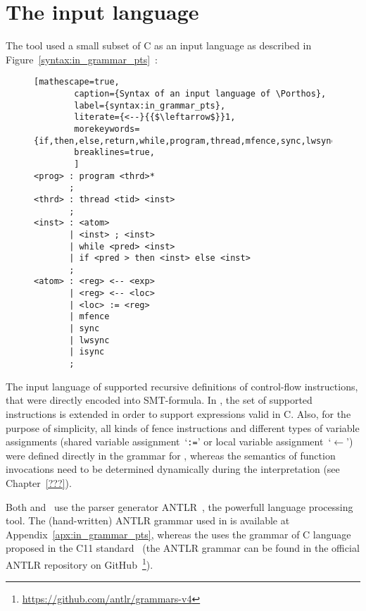 \chapter{The input language}
\label{ch:impl}

The \Porthos tool used a small subset of C as an input language as described in Figure~\ref{syntax:in_grammar_pts}~\cite{Porthos17}:

\begin{figure}[H]
\begin{lstlisting}[mathescape=true,
        caption={Syntax of an input language of \Porthos},
        label={syntax:in_grammar_pts},
        literate={<--}{{$\leftarrow$}}1,
        morekeywords={if,then,else,return,while,program,thread,mfence,sync,lwsync,isync}
        breaklines=true,
        ]
<prog> : program <thrd>*
       ;
<thrd> : thread <tid> <inst>
       ;
<inst> : <atom> 
       | <inst> ; <inst>
       | while <pred> <inst>
       | if <pred > then <inst> else <inst>
       ;
<atom> : <reg> <-- <exp> 
       | <reg> <-- <loc>
       | <loc> := <reg> 
       | mfence
       | sync
       | lwsync
       | isync
       ;
\end{lstlisting}
\end{figure}


The input language of \Porthos supported recursive definitions of control-flow instructions, that were directly encoded into SMT-formula. In \mousquetaires, the set of supported instructions is extended in order to support expressions valid in C.%
 Also, for the purpose of simplicity, all kinds of fence instructions and different types of variable assignments (shared variable assignment~`\texttt{:=}' or local variable assignment~`$\mathtt{\leftarrow}$') were defined directly in the grammar for \Porthos, whereas the semantics of function invocations need to be determined dynamically during the interpretation
(see Chapter~\ref{???}).

Both \Porthos and \mousquetaires \ use the parser generator ANTLR~\cite{parr2013definitive}, the powerfull language processing tool. The (hand-written) ANTLR grammar used in \Porthos is available at Appendix~\ref{apx:in_grammar_pts}, whereas the \mousquetaires uses the grammar of C language proposed in the C11 standard~\cite{jtc2011sc22} (the ANTLR grammar can be found in the official ANTLR repository on GitHub~\footnote{\url{https://github.com/antlr/grammars-v4}}).
